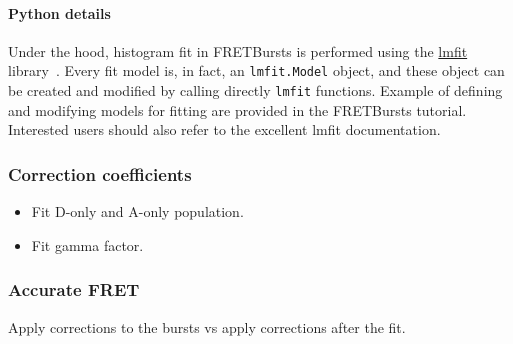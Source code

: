 \paragraph{Python details}
Under the hood, histogram fit in FRETBursts is performed using the
\href{http://lmfit.github.io/lmfit-py/}{lmfit} library~\cite{c09228b4-321a-404b-8f8c-e56696295eda}.
Every fit model is, in fact, an \verb|lmfit.Model| object, and these object
can be created and modified by calling directly \verb|lmfit| functions.
Example of defining and modifying models for fitting are provided in the FRETBursts tutorial. 
Interested users should also refer to the excellent lmfit documentation.

\subsubsection{Correction coefficients}

\begin{itemize}
\item Fit D-only and A-only population.
\item Fit gamma factor.
\end{itemize}


\subsubsection{Accurate FRET}

Apply corrections to the bursts vs apply corrections after the fit.


